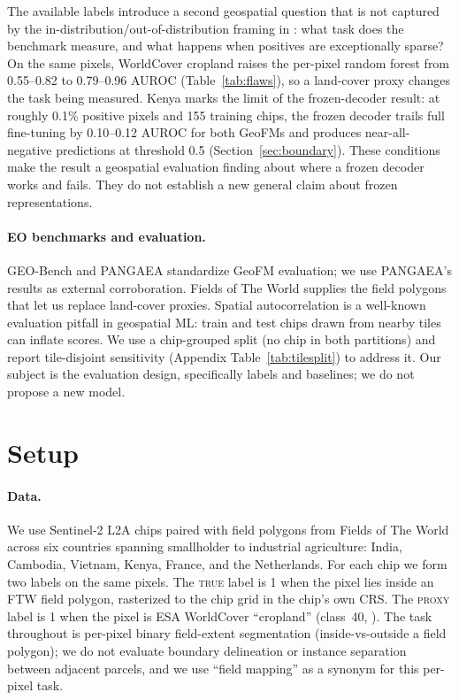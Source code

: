\documentclass{article}
\begin{document}
The available labels introduce a second geospatial question that is not captured by
the in-distribution/out-of-distribution framing in \citet{kumar2022finetuning}: what
task does the benchmark measure, and what happens when positives are exceptionally
sparse? On the same pixels,
WorldCover cropland raises the per-pixel random forest from 0.55--0.82 to 0.79--0.96
AUROC (Table~\ref{tab:flaws}), so a land-cover proxy changes the task being measured.
Kenya marks the limit of the frozen-decoder result: at roughly 0.1\% positive pixels and
155 training chips, the frozen decoder trails full fine-tuning by 0.10--0.12 AUROC for
both GeoFMs and produces near-all-negative predictions at threshold 0.5
(Section~\ref{sec:boundary}). These conditions make the result a geospatial evaluation
finding about where a frozen decoder works and fails. They do not establish a new
general claim about frozen representations.

\paragraph{EO benchmarks and evaluation.} GEO-Bench \citep{geobench} and PANGAEA
\citep{pangaea} standardize GeoFM evaluation; we use PANGAEA's results as external
corroboration. Fields of The World \citep{ftw} supplies the field polygons
that let us replace land-cover proxies. Spatial autocorrelation is a well-known
evaluation pitfall in geospatial ML: train and test
chips drawn from nearby tiles can inflate scores. We use a chip-grouped split
(no chip in both partitions) and report tile-disjoint sensitivity
(Appendix Table~\ref{tab:tilesplit}) to address it. Our subject is the evaluation
design, specifically labels and baselines; we do not propose a new model.

\FloatBarrier
\section{Setup}
\label{sec:setup}
\paragraph{Data.} We use Sentinel-2 L2A chips paired with field polygons from
Fields of The World \citep{ftw} across six countries spanning smallholder to
industrial agriculture: India, Cambodia, Vietnam, Kenya, France, and the Netherlands.
For each chip we form two labels on the same pixels. The \textsc{true} label is 1
when the pixel lies inside an FTW field polygon, rasterized to the chip grid in the
chip's own CRS. The \textsc{proxy} label is 1 when the pixel is ESA WorldCover
``cropland'' (class~40, \citealp{worldcover}). The task throughout is per-pixel binary
field-extent segmentation (inside-vs-outside a field polygon); we do not evaluate
boundary delineation or instance separation between adjacent parcels, and we use
``field mapping'' as a synonym for this per-pixel task.
\end{document}
